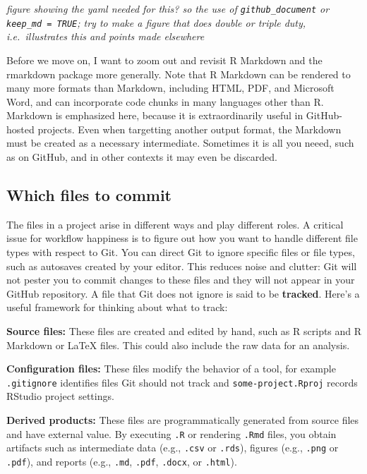 \documentclass[12pt]{article}
\begin{document}
\emph{figure showing the yaml needed for this? so the use of
\texttt{github\_document} or \texttt{keep\_md\ =\ TRUE}; try to make a
figure that does double or triple duty, i.e.~illustrates this and points
made elsewhere}

Before we move on, I want to zoom out and revisit R Markdown and the
rmarkdown package more generally. Note that R Markdown can be rendered
to many more formats than Markdown, including HTML, PDF, and Microsoft
Word, and can incorporate code chunks in many languages other than R.
Markdown is emphasized here, because it is extraordinarily useful in
GitHub-hosted projects. Even when targetting another output format, the
Markdown must be created as a necessary intermediate. Sometimes it is
all you neeed, such as on GitHub, and in other contexts it may even be
discarded.

\subsection{Which files to commit}\label{which-files-to-commit}

The files in a project arise in different ways and play different roles.
A critical issue for workflow happiness is to figure out how you want to
handle different file types with respect to Git. You can direct Git to
ignore specific files or file types, such as autosaves created by your
editor. This reduces noise and clutter: Git will not pester you to
commit changes to these files and they will not appear in your GitHub
repository. A file that Git does not ignore is said to be
\textbf{tracked}. Here's a useful framework for thinking about what to
track:

\textbf{Source files:} These files are created and edited by hand, such
as R scripts and R Markdown or LaTeX files. This could also include the
raw data for an analysis.

\textbf{Configuration files:} These files modify the behavior of a tool,
for example \texttt{.gitignore} identifies files Git should not track
and \texttt{some-project.Rproj} records RStudio project settings.

\textbf{Derived products:} These files are programmatically generated
from source files and have external value. By executing \texttt{.R} or
rendering \texttt{.Rmd} files, you obtain artifacts such as intermediate
data (e.g., \texttt{.csv} or \texttt{.rds}), figures (e.g.,
\texttt{.png} or \texttt{.pdf}), and reports (e.g., \texttt{.md},
\texttt{.pdf}, \texttt{.docx}, or \texttt{.html}).
\end{document}
